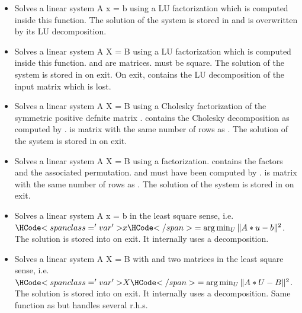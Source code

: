\begin{itemize}
\item {} 
  \sshortdescribe Solves a linear system A x = b using a LU factorization
  which is computed inside this function. The solution of the system is stored
  in  and  is overwritten by its LU decomposition.

\item {} 
  \sshortdescribe Solves a linear system A X = B using a LU factorization
  which is computed inside this function.  and   are
  matrices.  must be square. The solution of the system is stored in
   on exit. On exit,  contains the LU decomposition of the input
  matrix which is lost.

\item {}
  \sshortdescribe Solves a linear system A X = B using a Cholesky factorization
  of the symmetric positive defnite matrix .   contains the
  Cholesky decomposition as computed by .  is matrix
  with the same number of rows as . The solution of
  the system is stored in  on exit. 

\item {}
  \sshortdescribe Solves a linear system A X = B using a  factorization.
   contains the  factors and  the associated permutation.
   and  must have been computed by .  is matrix
  with the same number of rows as .
  The solution of the system is stored in  on exit. 

\item {}
  \sshortdescribe Solves a linear system A x = b in the least square sense,
  i.e. $\var{x} = \arg\min_U \| A * u - b\|^2$. The solution is stored into
   on exit. It internally uses a  decomposition.

\item {}
  \sshortdescribe Solves a linear system A X = B with  and  two
  matrices in the least square sense, i.e. $\var{X} = \arg\min_U \| A * U -
  B\|^2$. The solution is stored into  on exit. It internally uses a
   decomposition. Same function as  but handles
  several r.h.s.

\end{itemize}



